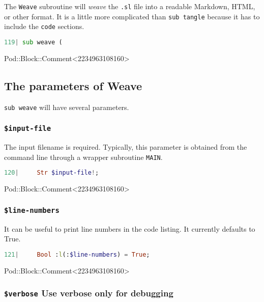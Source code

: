\documentclass{scrartcl}
\begin{document}
The \texttt{Weave} subroutine will \textit{weave} the \texttt{.sl} file
into a readable Markdown, HTML, or other format. It is a little more
complicated than \texttt{sub tangle} because it has to include the
\texttt{code} sections.

\begin{lstlisting}[language=Raku]
  119| sub weave (

\end{lstlisting}


Pod::Block::Comment<2234963108160>

\subsection{The parameters of Weave}

\texttt{sub weave} will have several parameters.

\subsubsection{\texttt{\$input-file}}

The input filename is required. Typically, this parameter is obtained from
the command line through a wrapper subroutine \texttt{MAIN}.

\begin{lstlisting}[language=Raku]
  120|     Str $input-file!;

\end{lstlisting}


Pod::Block::Comment<2234963108160>

\subsubsection{\texttt{\$line-numbers}}

It can be useful to print line numbers in the code listing. It currently
defaults to True.

\begin{lstlisting}[language=Raku]
  121|     Bool :l(:$line-numbers) = True;

\end{lstlisting}


Pod::Block::Comment<2234963108160>

\subsubsection{\texttt{\$verbose} Use verbose only for debugging}
\end{document}
